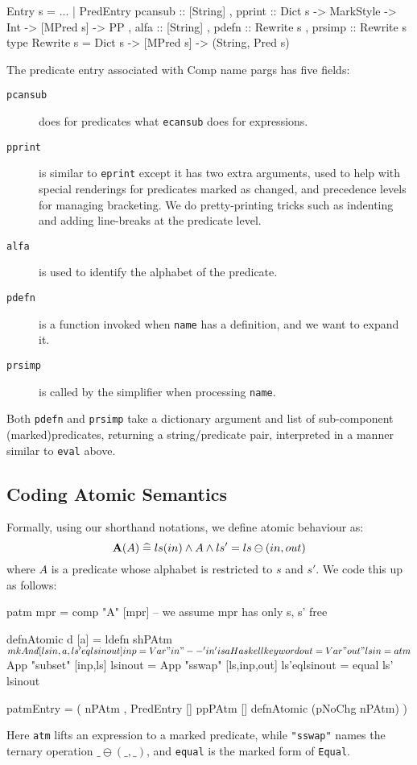 \begin{code}
Entry s
  = ...
  | PredEntry
    { pcansub :: [String]
    , pprint :: Dict s -> MarkStyle -> Int -> [MPred s] -> PP
    , alfa :: [String]
    , pdefn :: Rewrite s
    , prsimp :: Rewrite s }
type Rewrite s = Dict s -> [MPred s] -> (String, Pred s)
\end{code}
The predicate entry associated with Comp name pargs
has five fields:
\begin{description}
  \item[\texttt{pcansub}]
    does for predicates what \texttt{ecansub} does for expressions.
  \item[\texttt{pprint}]
    is similar to \texttt{eprint} except it has two extra arguments,
    used to help with special renderings for predicates marked as changed,
    and precedence levels for managing bracketing.
    We do pretty-printing tricks such as indenting and adding line-breaks
    at the predicate level.
  \item[\texttt{alfa}]
    is used to identify the alphabet of the predicate.
  \item[\texttt{pdefn}]
    is a function invoked when \texttt{name} has a definition,
    and we want to expand it.
  \item[\texttt{prsimp}]
    is called by the simplifier when processing \texttt{name}.
\end{description}
Both \texttt{pdefn} and \texttt{prsimp} take a dictionary argument
and list of sub-component (marked)predicates,
returning a string/predicate pair,
interpreted in a manner similar to \texttt{eval} above.


\subsection{Coding Atomic Semantics}

Formally, using our shorthand notations, we define atomic behaviour as:
\[
    \mathbf{A}(A) \mathrel{\widehat=} ls(in) \land A \land ls'=ls\ominus(in,out)
\]
where $A$ is a predicate whose alphabet is restricted to $s$ and $s'$.
We code this up as follows:
\begin{code}
patm mpr = comp "A" [mpr] -- we assume mpr has only s, s' free

defnAtomic d [a] = ldefn shPAtm $ mkAnd [lsin,a,ls'eqlsinout]

inp = Var "in" -- 'in' is a Haskell keyword
out = Var "out"
lsin = atm $ App "subset" [inp,ls]
lsinout = App "sswap" [ls,inp,out]
ls'eqlsinout = equal ls' lsinout

patmEntry
 = ( nPAtm
   , PredEntry [] ppPAtm [] defnAtomic (pNoChg nPAtm) )
\end{code}
Here \texttt{atm} lifts an expression to a marked predicate,
while \texttt{"sswap"} names the ternary operation $\_\ominus(\_,\_)$,
and \texttt{equal} is the marked form of \texttt{Equal}.


